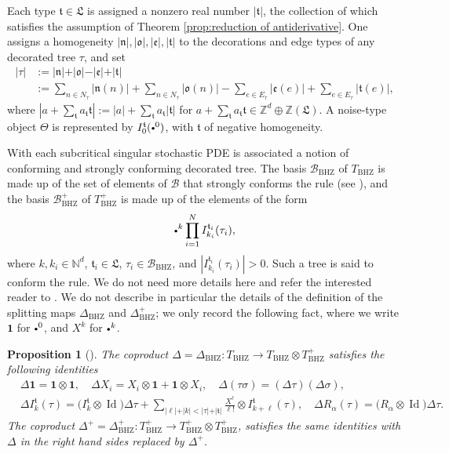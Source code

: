 \documentclass[11pt]{article}
\numberwithin{equation}{section}
\newcommand{\sbullet}{{\scriptscriptstyle\bullet}}
\newcommand{\scbullet}{{\raisebox{1pt}{$\sbullet$}}}
\theoremstyle{plain}
\newtheorem{prop}[thm]{Proposition}
\theoremstyle{definition}
\DeclareMathOperator{\iden}{Id}
\newcommand{\unit}{\mathbf{1}}
\newcommand{\BHZ}{{\scriptscriptstyle\mathrm{BHZ}}}
\newcommand{\bsmcB}{\boldsymbol{\mathcal{B}}}
\newcommand{\frkL}{\mathfrak{L}}
\newcommand{\frkt}{\mathfrak{t}}
\newcommand{\frkn}{\mathfrak{n}}
\newcommand{\frko}{\mathfrak{o}}
\newcommand{\frke}{\mathfrak{e}}
\newcommand{\bbN}{\mathbb{N}}
\newcommand{\bbZ}{\mathbb{Z}}
\newcommand{\mcB}{\mathcal{B}}
\begin{document}
Each type $\frkt\in\frkL$ is assigned a nonzero real number $|\frkt|$, the collection of which satisfies the assumption of Theorem \ref{prop:reduction of antiderivative}. One assigns a homogeneity $\vert\frkn\vert, \vert\frko\vert, \vert\frke\vert, \vert\frkt\vert$ to the decorations and edge types of any decorated tree $\tau$, and set
\begin{align*}
\vert\tau\vert &:= \vert\frkn\vert + \vert\frko\vert - \vert\frke\vert + \vert\frkt\vert\\
&:=\sum_{n\in N_\tau}|\frkn(n)|+\sum_{n\in N_\tau}|\frko(n)|-\sum_{e\in E_\tau}|\frke(e)|+\sum_{e\in E_\tau}|\frkt(e)|,
\end{align*}
where $|a+\sum_{\frkt}a_\frkt\frkt|:=|a|+\sum_{\frkt}a_\frkt|\frkt|$ for $a+\sum_{\frkt}a_{\frkt}\frkt\in\bbZ^d\oplus\bbZ(\frkL)$.
A noise-type object $\Theta$ is represented by $I_0^{\frkt}(\scbullet^0)$, with $\frkt$ of negative homogeneity.

With each subcritical singular stochastic PDE is associated a notion of conforming and strongly conforming decorated tree. The basis $\mcB_{\BHZ}$ of $T_{\BHZ}$ is made up of the set of elements of $\bsmcB$ that strongly conforms the rule (see \cite[\S5]{BHZ}), and the basis $\mcB_{\BHZ}^+$ of $T_{\BHZ}^+$ is made up of the elements of the form
\[
\scbullet^k\prod_{i=1}^NI_{k_i}^{\frkt_i}(\tau_i),
\]
where $k,k_i\in\bbN^d$, $\frkt_i\in\frkL$, $\tau_i\in\mcB_{\BHZ}$, and $|I_{k_i}^{\frkt_i}(\tau_i)|>0$.
Such a tree is said to conform the rule. We do not need more details here and refer the interested reader to \cite[\S5]{BHZ}. We do not describe in particular the details of the definition of the splitting maps $\Delta_\BHZ$ and $\Delta^+_\BHZ$; we only record the following fact, where we write $\unit$ for $\scbullet^0$, and $X^k$ for $\scbullet^k$.

\begin{prop}[{\cite[Prop.\,4.17]{BHZ}}]\label{recursive def of Delta}
The coproduct $\Delta=\Delta_{\BHZ}:T_\BHZ\to T_\BHZ\otimes T^+_\BHZ$ satisfies the following identities
\begin{align*}
&\Delta\unit=\unit\otimes\unit,\quad \Delta X_i=X_i\otimes\unit+\unit\otimes X_i,\quad \Delta(\tau\sigma)=(\Delta\tau)(\Delta\sigma), \\
&\Delta I_k^\frkt(\tau) = \bigl(I_k^\frkt\otimes\iden\bigr)\Delta\tau + \sum_{\vert\ell\vert+\vert k\vert <\vert \tau\vert+\vert\frkt\vert}\frac{X^\ell}{\ell!}\otimes I_{k+\ell}^\frkt(\tau),\quad
\Delta R_\alpha(\tau) = \bigl(R_\alpha\otimes\iden\bigr)\Delta\tau.
\end{align*}
The coproduct $\Delta^+=\Delta_{\BHZ}^+:T^+_\BHZ\to T^+_\BHZ\otimes T^+_\BHZ$, satisfies the same identities with $\Delta$ in the right hand sides replaced by $\Delta^+$.
\end{prop}
\end{document}
